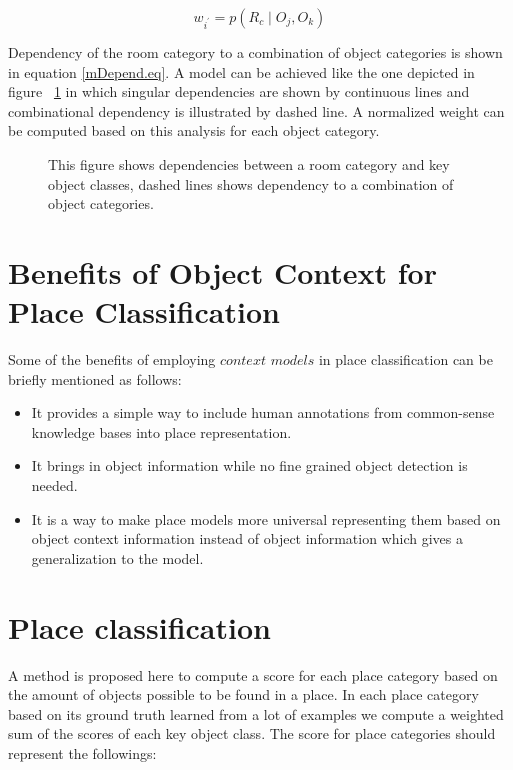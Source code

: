 \begin{equation}
 \label{mDepend.eq}
 w_{i^{'}} = p(R_c \mid O_j,O_k)
\end{equation}

Dependency of the room category to a combination of object categories is shown in equation \ref{mDepend.eq}. 
A model can be achieved like the one depicted in figure ~\ref{RoomObjectDepend.figure} in which singular dependencies are shown by continuous 
lines and combinational dependency is illustrated by dashed line.
A normalized weight can be computed based on this analysis for each object category.  

 \begin{figure}[t]
  \caption[Probabilistic graphical model of place-object.]
  {This figure shows dependencies between a room category and key object classes, dashed lines shows dependency to a combination of object categories.}
  \label{RoomObjectDepend.figure}
\end{figure}

 
\section{Benefits of Object Context for Place Classification}
\label{BenefitsofObjectContextforPlaceClassification.sec}
Some of the benefits of employing $context$ $models$ in place classification can be briefly mentioned as follows: 
\begin{itemize}
 \item It provides a simple way to include human annotations from common-sense knowledge bases into place 
 representation.
 \item It brings in object information while no fine grained object detection is needed.
 \item It is a way to make place models more universal representing them based on object context information instead
 of object information which gives a generalization to the model.
 
\end{itemize}


\section{Place classification}
\label{Place classification.sec}
A method is proposed here to compute a score for each place category based on the amount of objects possible to be
found in a place. 
In each place category based on its ground truth learned from a lot of examples we compute a weighted sum of the 
scores of each key object class.
The score for place categories should represent the followings:

